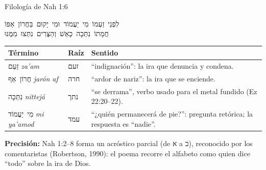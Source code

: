 \documentclass[hyperref={bookmarks=false},aspectratio=169]{beamer}
\newcommand{\heb}[1]{\mbox{\foreignlanguage{hebrew}{#1}}}
\newcommand{\precision}[1]{{\footnotesize\color{gris}\textbf{Precisión:} #1}}
\begin{document}
\begin{frame}{Filología de Nah 1:6}
\begin{center}\heb{לִפְנֵי זַעְמוֹ מִי יַעֲמוֹד וּמִי יָקוּם בַּחֲרוֹן אַפּוֹ}\\ \heb{חֲמָתוֹ נִתְּכָה כָאֵשׁ וְהַצֻּרִים נִתְּצוּ מִמֶּנּוּ}\end{center}
\renewcommand{\arraystretch}{1.2}\scriptsize
\begin{tabular}{@{}>{\RaggedRight\arraybackslash}p{2.6cm}>{\RaggedRight\arraybackslash}p{1.2cm}>{\RaggedRight\arraybackslash}p{7.9cm}@{}}
\toprule
\textbf{Término} & \textbf{Raíz} & \textbf{Sentido} \\ \midrule
\heb{זַעַם} \emph{za'am} & \heb{זעם} & ``indignación'': la ira que denuncia y condena. \\
\heb{חֲרוֹן אַף} \emph{jarón af} & \heb{חרה} & ``ardor de nariz'': la ira que se enciende. \\
\heb{נִתְּכָה} \emph{nittejá} & \heb{נתך} & ``se derrama'', verbo usado para el metal fundido (Ez 22:20--22). \\
\heb{מִי יַעֲמוֹד} \emph{mi ya'amod} & \heb{עמד} & ``¿quién permanecerá de pie?'': pregunta retórica; la respuesta es ``nadie''. \\
\bottomrule
\end{tabular}\par\medskip
\centering
{}\par\smallskip
\precision{Nah 1:2--8 forma un acróstico parcial (de \heb{א} a \heb{כ}), reconocido por los comentaristas (Robertson, 1990): el poema recorre el alfabeto como quien dice ``todo'' sobre la ira de Dios.}
\end{frame}
\end{document}
